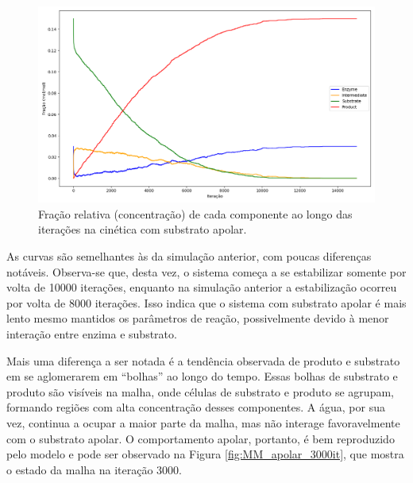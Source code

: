 \documentclass[12pt,oneside]{report}
\begin{document}
\begin{figure}[H]
    \centering
    \includegraphics[width=1\textwidth]{img/MM_apolar_conc.png}
    \caption{\small Fração relativa (concentração) de cada componente ao longo das iterações na cinética com substrato apolar.}
    \label{fig:MM_apolar_conc}
\end{figure}

As curvas são semelhantes às da simulação anterior, com poucas diferenças notáveis. Observa-se que, desta vez, o sistema começa a se estabilizar somente por volta de 10000 iterações, enquanto na simulação anterior a estabilização ocorreu por volta de 8000 iterações. Isso indica que o sistema com substrato apolar é mais lento mesmo mantidos os parâmetros de reação, possivelmente devido à menor interação entre enzima e substrato.

Mais uma diferença a ser notada é a tendência observada de produto e substrato em se aglomerarem em ``bolhas'' ao longo do tempo. Essas bolhas de substrato e produto são visíveis na malha, onde células de substrato e produto se agrupam, formando regiões com alta concentração desses componentes. A água, por sua vez, continua a ocupar a maior parte da malha, mas não interage favoravelmente com o substrato apolar. O comportamento apolar, portanto, é bem reproduzido pelo modelo e pode ser observado na Figura \ref{fig:MM_apolar_3000it}, que mostra o estado da malha na iteração 3000.
\end{document}
